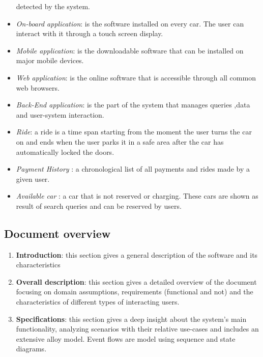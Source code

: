 \documentclass[12pt]{article}
\begin{document}
\begin{itemize}
			  detected by the system. 
		\item \textit{On-board application}: is the software installed on every car. The user 
			  can interact with it through a touch screen display.
		\item \textit{Mobile application}: is the downloadable software that can be installed 
			  on major mobile devices.
		\item \textit{Web application}: is the online software that is accessible through all 			 	  common web browsers.
		\item \textit{Back-End application}: is the part of the system that manages queries 
			  ,data and user-system interaction.
		\item \textit{Ride}: a ride is a time span starting from the moment the user turns the 
			  car on and ends when the user parks it in a safe area after the car has 
			  automatically locked the doors.
		\item \textit{Payment History} : a chronological list of all payments and rides made by 
			  a given user.
		\item \textit{Available car} : a car that is not reserved or charging. These cars are 
			  shown as result of search queries and can be reserved by users.
	\end{itemize}		
	
	
	
	\subsection{Document overview}
	\begin{enumerate}
		\item \textbf{Introduction}: this section gives a general 	description of the 
			  software and its characteristics 
		\item \textbf{Overall description}: this section gives a detailed overview of the 
			  document focusing on domain assumptions, requirements (functional and not) and 
			  the characteristics of different types of interacting users.
		\item \textbf{Specifications}: this section gives a deep insight about the system's 
			  main functionality, analyzing scenarios with their relative use-cases and 
			  includes an extensive alloy model. Event flows are model using sequence and state 
			  diagrams.
	\end{enumerate}	
	\newpage
	
\end{document}
